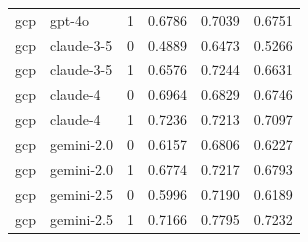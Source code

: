 \begin{tabular}{llrrrr}
gcp & gpt-4o & 1 & 0.6786 & 0.7039 & 0.6751 \\
gcp & claude-3-5 & 0 & 0.4889 & 0.6473 & 0.5266 \\
gcp & claude-3-5 & 1 & 0.6576 & 0.7244 & 0.6631 \\
gcp & claude-4 & 0 & 0.6964 & 0.6829 & 0.6746 \\
gcp & claude-4 & 1 & 0.7236 & 0.7213 & 0.7097 \\
gcp & gemini-2.0 & 0 & 0.6157 & 0.6806 & 0.6227 \\
gcp & gemini-2.0 & 1 & 0.6774 & 0.7217 & 0.6793 \\
gcp & gemini-2.5 & 0 & 0.5996 & 0.7190 & 0.6189 \\
gcp & gemini-2.5 & 1 & 0.7166 & 0.7795 & 0.7232 \\
\bottomrule
\end{tabular}
